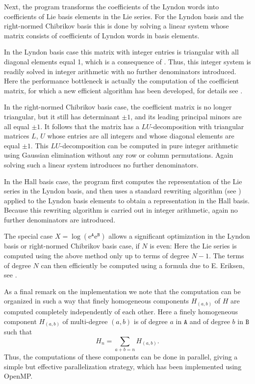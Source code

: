 \documentclass[11pt,a4paper]{article}
\newcommand{\ee}{\mathrm{e}}
\renewcommand{\AA}{\mathtt{A}}
\newcommand{\BB}{\mathtt{B}}
\begin{document}
Next, the program transforms the coefficients of the Lyndon words into coefficients
of Lie basis elements in the Lie series.
For the Lyndon basis and the right-normed Chibrikov basis this is done by solving a linear system whose matrix consists of coefficients of Lyndon words in basis elements.

In the Lyndon basis case this matrix with integer entries is triangular with all diagonal
elements equal 1, which is a consequence of \cite[Theorem~5.1]{Reutenauer}. Thus, this
integer system is readily solved in integer arithmetic with no further denominators introduced.
Here the performance bottleneck is actually the computation of the coefficient matrix,
for which a new efficient algorithm has been developed, for details see \cite{HHfast}. 

In the right-normed Chibrikov basis case, the coefficient matrix is no longer
triangular, but it still has determinant $\pm 1$, and its leading principal
minors are all equal $\pm 1$. It follows that the matrix has a $LU$-decomposition
with triangular matrices $L$, $U$ whose entries are all integers and whose diagonal
elements are equal $\pm 1$. This $LU$-decomposition can be computed 
in pure integer arithmetic using Gaussian elimination without any row or column permutations.
Again solving such a linear system  introduces no further denominators.

In the Hall basis case, the program first computes the representation of
the Lie series in the Lyndon basis, and then uses a standard rewriting algorithm
(see \cite[Section~4.2]{Reutenauer})
applied to the Lyndon basis elements to obtain a representation in the Hall basis.
Because this rewriting algorithm is carried out in integer arithmetic, again no further
denominators are introduced.

The special case $X=\log(\ee^\AA\ee^\BB)$ allows a significant optimization in 
the Lyndon basis or right-normed Chibrikov basis case, if $N$ is even: 
Here the Lie series is computed using the above method only up to terms
of degree $N-1$. The terms of degree $N$ can then efficiently be computed using a
formula due to E. Eriksen, see \cite[Section~III.A]{Eriksen}.


As a final remark on the implementation we note that the computation can
be organized in such a way that finely homogeneous components 
$H_{(a,b)}$ of $H$ are computed completely independently of each other.
Here a finely homogeneous component $H_{(a,b)}$ of multi-degree $(a,b)$
is of degree $a$ in $\AA$ and of degree $b$ in $\BB$ such that
$$H_n = \sum_{a+b=n}H_{(a,b)}.$$
Thus, the computations of these components can be done in parallel, giving a
simple but effective parallelization strategy, which 
has been implemented using OpenMP.
\end{document}

